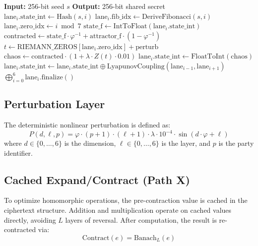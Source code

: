 \documentclass[11pt,a4paper]{article}
\begin{document}
\begin{algorithm}
\caption{7-Lane Lyapunov-Riemann Parallel KEM}
\begin{algorithmic}[1]
\State \textbf{Input:} 256-bit seed $s$
\State \textbf{Output:} 256-bit shared secret
 
\State $\text{lane}_i.\text{state\_int} \gets \text{Hash}(s, i)$ 
\State $\text{lane}_i.\text{fib\_idx} \gets \text{DeriveFibonacci}(s, i)$
\State $\text{lane}_i.\text{zero\_idx} \gets i \bmod 7$ 
\EndFor
{} 
\State $\text{state\_f} \gets \text{IntToFloat}(\text{lane}_i.\text{state\_int})$ 
\State $\text{contracted} \gets \text{state\_f} \cdot \varphi^{-1} + \text{attractor\_f} \cdot (1 - \varphi^{-1})$
\State $t \gets \text{RIEMANN\_ZEROS}[\text{lane}_i.\text{zero\_idx}] + \text{perturb}$
\State $\text{chaos} \gets \text{contracted} \cdot (1 + \lambda \cdot Z(t) \cdot 0.01)$
\State $\text{lane}_i.\text{state\_int} \gets \text{FloatToInt}(\text{chaos})$ 
\State $\text{lane}_i.\text{state\_int} \gets \text{lane}_i.\text{state\_int} \oplus \text{LyapunovCoupling}(\text{lane}_{i-1}, \text{lane}_{i+1})$
\EndFor
\EndFor
\State \Return $\bigoplus_{i=0}^{6} \text{lane}_i.\text{finalize}()$ 
\end{algorithmic}
\end{algorithm}

\subsection{Perturbation Layer}

The deterministic nonlinear perturbation is defined as:
\[
P(d, \ell, p) = \varphi \cdot (p + 1) \cdot (\ell + 1) \cdot \lambda \cdot 10^{-4} \cdot \sin(d \cdot \varphi + \ell)
\]
where $d \in \{0, \ldots, 6\}$ is the dimension, $\ell \in \{0, \ldots, 6\}$ is the layer, and $p$ is the party identifier.

\subsection{Cached Expand/Contract (Path X)}

To optimize homomorphic operations, the pre-contraction value is cached in the ciphertext structure. Addition and multiplication operate on cached values directly, avoiding $L$ layers of reversal. After computation, the result is re-contracted via:
\[
\text{Contract}(e) = \text{Banach}_L(e)
\]
\end{document}
